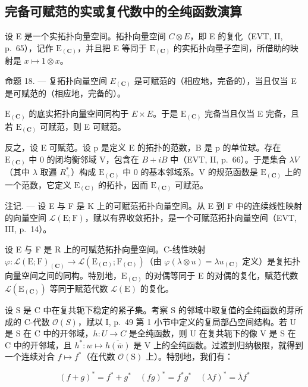 \subsection{完备可赋范的实或复代数中的全纯函数演算}

设 E 是一个实拓扑向量空间。拓扑向量空间 \(C \otimes E\)，即 E 的复化（EVT, II, p.~65），记作 \(\mathrm{E}_{(\mathbf{C})}\)，并且把 E 等同于 \(\mathrm{E}_{(\mathbf{C})}\) 的实拓扑向量子空间，所借助的映射是 \(x \mapsto 1 \otimes x\)。

命题 18. --- 复拓扑向量空间 \(E_{(\mathbf{C})}\) 是可赋范的（相应地，完备的），当且仅当 E 是可赋范的（相应地，完备的）。

\(\mathrm{E}_{(\mathbf{C})}\) 的底实拓扑向量空间同构于 \(E \times E\)。于是 \(\mathrm{E}_{(\mathbf{C})}\) 完备当且仅当 E 完备，且若 \(\mathrm{E}_{(\mathbf{C})}\) 可赋范，则 E 可赋范。

反之，设 E 可赋范。设 p 是定义 E 的拓扑的范数，B 是 p 的单位球。存在 \(\mathrm{E}_{(\mathbf{C})}\) 中 0 的闭均衡邻域 V，包含在 \(B+iB\) 中（EVT, II, p.~66）。于是集合 \(\lambda V\)（其中 \(\lambda\) 取遍 \(R_{+}^{*}\)）构成 \(\mathrm{E}_{(\mathbf{C})}\) 中 0 的基本邻域系。V 的规范函数是 \(\mathrm{E}_{(\mathbf{C})}\) 上的一个范数，它定义 \(\mathrm{E}_{(\mathbf{C})}\) 的拓扑，因而 \(\mathrm{E}_{(\mathbf{C})}\) 可赋范。

注记. --- 设 E 与 F 是 K 上的可赋范拓扑向量空间。从 E 到 F 中的连续线性映射的向量空间 \(\mathcal{L}(\mathrm{E};\mathrm{F})\)，赋以有界收敛拓扑，是一个可赋范拓扑向量空间（EVT, III, p.~14）。

设 E 与 F 是 R 上的可赋范拓扑向量空间。C-线性映射 \(\varphi\colon\mathcal{L}(\mathrm{E};\mathrm{F})_{(\mathbf{C})}\to\mathcal{L}(\mathrm{E}_{(\mathbf{C})};\mathrm{F}_{(\mathbf{C})})\)（由 \(\varphi(\lambda\otimes u)=\lambda u_{(\mathbf{C})}\) 定义）是复拓扑向量空间之间的同构。特别地，\(\mathrm{E}_{(\mathbf{C})}\) 的对偶等同于 E 的对偶的复化，赋范代数 \(\mathcal{L}(\mathrm{E}_{(\mathbf{C})})\) 等同于赋范代数 \(\mathcal{L}(\mathrm{E})\) 的复化。

设 S 是 C 中在复共轭下稳定的紧子集。考察 S 的邻域中取复值的全纯函数的芽所成的 C-代数 \(\mathcal{O}(S)\)，赋以 I, p.~49 第 1 小节中定义的复局部凸空间结构。若 U 是 S 在 C 中的开邻域，\(h: U \to C\) 是全纯函数，则 U 在复共轭下的像 V 是 S 在 C 中的开邻域，且 \(h^{*}: w \mapsto \overline{h(\overline{w})}\) 是 V 上的全纯函数。过渡到归纳极限，就得到一个连续对合 \(f\mapsto f^{*}\)（在代数 \(\mathcal{O}(\mathrm{S})\) 上）。特别地，我们有：

\[
(f + g) ^ {*} = f ^ {*} + g ^ {*} \quad (f g) ^ {*} = f ^ {*} g ^ {*} \quad (\lambda f) ^ {*} = \bar {\lambda} f ^ {*}
\]

